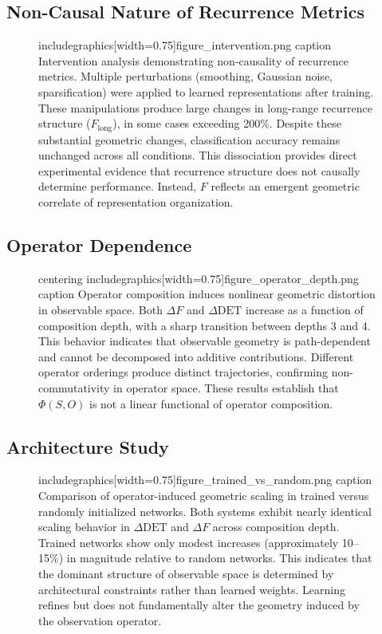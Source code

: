 \documentclass[11pt]{article}
\begin{document}
\subsection{Non-Causal Nature of Recurrence Metrics}

\begin{figure}[H]
	\centering
	includegraphics[width=0.75\linewidth]{figure_intervention.png}
	caption{
			Intervention analysis demonstrating non-causality of recurrence metrics.
			Multiple perturbations (smoothing, Gaussian noise, sparsification) were applied to learned representations after training.
			These manipulations produce large changes in long-range recurrence structure ($F_{\text{long}}$), in some cases exceeding 200\%.
			Despite these substantial geometric changes, classification accuracy remains unchanged across all conditions.
			This dissociation provides direct experimental evidence that recurrence structure does not causally determine performance.
			Instead, $F$ reflects an emergent geometric correlate of representation organization.
		}
	\label{fig:intervention}
\end{figure}

\subsection{Operator Dependence}

\begin{figure}[H]
	centering
	includegraphics[width=0.75\linewidth]{figure_operator_depth.png}
	caption{
			Operator composition induces nonlinear geometric distortion in observable space.
			Both $\Delta F$ and $\Delta \mathrm{DET}$ increase as a function of composition depth, with a sharp transition between depths 3 and 4.
			This behavior indicates that observable geometry is path-dependent and cannot be decomposed into additive contributions.
			Different operator orderings produce distinct trajectories, confirming non-commutativity in operator space.
			These results establish that $\Phi(S,O)$ is not a linear functional of operator composition.
		}
	\label{fig:operator_depth}
\end{figure}

\subsection{Architecture Study}

\begin{figure}[H]
	\centering
	includegraphics[width=0.75\linewidth]{figure_trained_vs_random.png}
	caption{
			Comparison of operator-induced geometric scaling in trained versus randomly initialized networks.
			Both systems exhibit nearly identical scaling behavior in $\Delta \mathrm{DET}$ and $\Delta F$ across composition depth.
			Trained networks show only modest increases (approximately 10–15\%) in magnitude relative to random networks.
			This indicates that the dominant structure of observable space is determined by architectural constraints rather than learned weights.
			Learning refines but does not fundamentally alter the geometry induced by the observation operator.
		}
	\label{fig:trained_random}
\end{figure}
\end{document}
